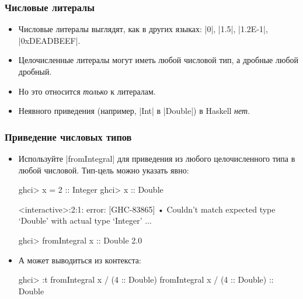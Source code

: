 \documentclass[10pt]{beamer}
\begin{document}
\begin{frame}[fragile]
  \frametitle{Числовые литералы}
  \begin{itemize}
    \item Числовые литералы выглядят, как в других языках: \haskinline|0|, \haskinline|1.5|, \haskinline|1.2E-1|, \haskinline|0xDEADBEEF|.
    \item Целочисленные литералы могут иметь любой числовой тип, а дробные любой дробный.
    \item Но это относится \emph{только} к литералам.
    \item Неявного приведения (например, \haskinline|Int| в \haskinline|Double|) в Haskell \emph{нет}.
  \end{itemize}
\end{frame}

\begin{frame}[fragile]
  \frametitle{Приведение числовых типов}
  \begin{itemize}
    \item Используйте \haskinline|fromIntegral| для приведения из любого целочисленного типа в любой числовой. Тип-цель можно указать явно:
          \begin{haskell}
            ghci> x = 2 :: Integer
            ghci> x :: Double
          \end{haskell}
          \begin{ghcismall}
            <interactive>:2:1: error: [GHC-83865]
                • Couldn't match expected type ‘Double’
                  with actual type ‘Integer’ ...
          \end{ghcismall}
          \begin{haskell}
            ghci> fromIntegral x :: Double
            2.0
          \end{haskell}
    \item А может выводиться из контекста:
          \begin{haskell}
            ghci> :t fromIntegral x / (4 :: Double)
            fromIntegral x / (4 :: Double) :: Double
          \end{haskell}
  \end{itemize}
\end{frame}
\end{document}
